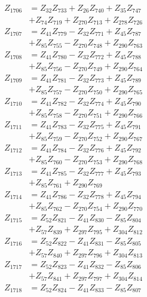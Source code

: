 \begin{multicols}{2}
\begin{align}
Z_{1706} &= Z_{32}Z_{733} + Z_{26}Z_{740} + Z_{35}Z_{747}  \nonumber \\
&+ Z_{74}Z_{719} + Z_{270}Z_{713} + Z_{278}Z_{726} \nonumber \\
Z_{1707} &= Z_{41}Z_{779} - Z_{32}Z_{771} + Z_{45}Z_{787}  \nonumber \\
&+ Z_{85}Z_{755} - Z_{270}Z_{748} + Z_{290}Z_{763} \nonumber \\
Z_{1708} &= Z_{41}Z_{780} - Z_{32}Z_{772} + Z_{45}Z_{788}  \nonumber \\
&+ Z_{85}Z_{756} - Z_{270}Z_{749} + Z_{290}Z_{764} \nonumber \\
Z_{1709} &= Z_{41}Z_{781} - Z_{32}Z_{773} + Z_{45}Z_{789}  \nonumber \\
&+ Z_{85}Z_{757} - Z_{270}Z_{750} + Z_{290}Z_{765} \nonumber \\
Z_{1710} &= Z_{41}Z_{782} - Z_{32}Z_{774} + Z_{45}Z_{790}  \nonumber \\
&+ Z_{85}Z_{758} - Z_{270}Z_{751} + Z_{290}Z_{766} \nonumber \\
Z_{1711} &= Z_{41}Z_{783} - Z_{32}Z_{775} + Z_{45}Z_{791}  \nonumber \\
&+ Z_{85}Z_{759} - Z_{270}Z_{752} + Z_{290}Z_{767} \nonumber \\
Z_{1712} &= Z_{41}Z_{784} - Z_{32}Z_{776} + Z_{45}Z_{792}  \nonumber \\
&+ Z_{85}Z_{760} - Z_{270}Z_{753} + Z_{290}Z_{768} \nonumber \\
Z_{1713} &= Z_{41}Z_{785} - Z_{32}Z_{777} + Z_{45}Z_{793}  \nonumber \\
&+ Z_{85}Z_{761} + Z_{290}Z_{769} \nonumber \\
Z_{1714} &= Z_{41}Z_{786} - Z_{32}Z_{778} + Z_{45}Z_{794}  \nonumber \\
&+ Z_{85}Z_{762} - Z_{270}Z_{754} + Z_{290}Z_{770} \nonumber \\
Z_{1715} &= Z_{52}Z_{821} - Z_{41}Z_{830} - Z_{85}Z_{804}  \nonumber \\
&+ Z_{57}Z_{839} + Z_{297}Z_{795} + Z_{304}Z_{812} \nonumber \\
Z_{1716} &= Z_{52}Z_{822} - Z_{41}Z_{831} - Z_{85}Z_{805}  \nonumber \\
&+ Z_{57}Z_{840} + Z_{297}Z_{796} + Z_{304}Z_{813} \nonumber \\
Z_{1717} &= Z_{52}Z_{823} - Z_{41}Z_{832} - Z_{85}Z_{806}  \nonumber \\
&+ Z_{57}Z_{841} + Z_{297}Z_{797} + Z_{304}Z_{814} \nonumber \\
Z_{1718} &= Z_{52}Z_{824} - Z_{41}Z_{833} - Z_{85}Z_{807}  \nonumber \\

\end{align}
\end{multicols}
